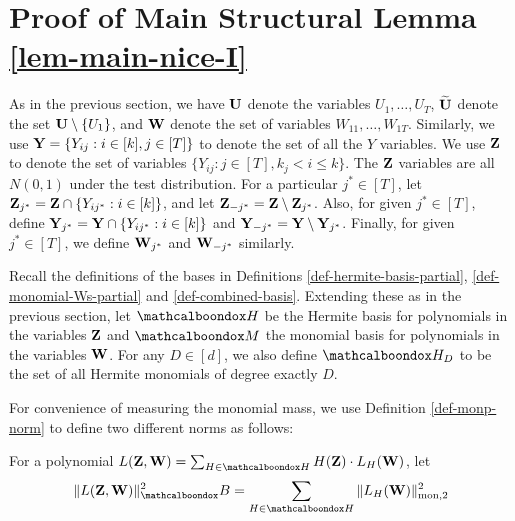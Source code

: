 \section{Proof of Main Structural Lemma \ref{lem-main-nice-I}}\label{sec:findingj}

\newcommand{\Hq}{\widehat{Q}}
\newcommand{\Hp}{\widehat{P}}
\newcommand{\basisA}{{\mcb{B}}}
\newcommand{\basisB}{{\mcb{B}_{-j^*}}}

As in the previous section, we have ${\bf U}$ denote the variables $U_1,\ldots,U_T$, $\Wu$ denote the set ${\bf U} \setminus \{U_1\}$, and ${\bf W}$ denote the set of variables $W_{11},\ldots,W_{1T}$. Similarly, we use $\mbf{Y} = \{Y_{ij} : i \in [k],j \in[T]\}$ to denote the set of all the $Y$ variables. We use $\mbf{Z}$ to denote the set of variables $\{Y_{ij}: j \in [T], k_j < i\leq k\}$. The $\mbf{Z}$ variables are all $N(0,1)$ under the test distribution. For a particular $j^* \in [T]$, let $\mbf{Z}_{j^*} = \mbf{Z} \cap \{Y_{ij^*}: i \in [k]\}$, and let $\mbf{Z}_{-j^*} = \mbf{Z}\setminus \mbf{Z}_{j^*}$. Also, for given $j^*\in [T]$, define $\mbf{Y}_{j^*} = \mbf{Y}\cap \{Y_{ij^*}: i \in [k]\}$ and $\mbf{Y}_{-j^*}= \mbf{Y}\setminus \mbf{Y}_{j^*}$. 
Finally, for given $j^* \in [T]$, we define $\mbf{W}_{j^*}$ and $\mbf{W}_{-j^*}$ similarly.

Recall the definitions of the bases in Definitions \ref{def-hermite-basis-partial}, \ref{def-monomial-Ws-partial} and \ref{def-combined-basis}. Extending these as in the previous section, let $\mcb{H}$ be the Hermite basis for polynomials in the variables $\mbf{Z}$ and $\mcb{M}$ the monomial basis for polynomials in the variables $\mbf{W}$. For any $D \in [d]$, we also define $\mcb{H}_D$ to be the set of all Hermite monomials of degree exactly $D$. 

For convenience of measuring the monomial mass, we use Definition \ref{def-monp-norm} to define two different norms as follows:
 
\begin{definition}[$\|\cdot\|_\basisA$-Norm]				\label{defn:basisA}
For a polynomial $L({\bf Z},{\bf W}) = \sum_{H \in \mcb{H}}H(\mbf{Z}) \cdot L_H({\bf W})$, let
\begin{equation}
\|L({\bf Z},{\bf W})\|^2_\mcb{B} = \sum_{H \in \mcb{H}} \|L_{H}({\bf W})\|^2_{\rm mon,2} 
\end{equation}	
\end{definition}

